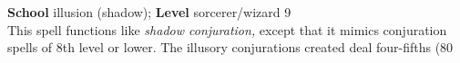 \textbf{School} illusion (shadow); \textbf{Level} sorcerer/wizard 9\\
This spell functions like \textit{shadow conjuration, }except that it mimics conjuration spells of 8th level or lower. The illusory conjurations created deal four-fifths (80%
